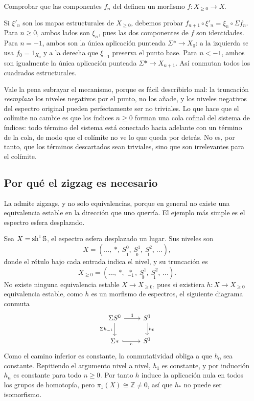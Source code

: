 \begin{ejer}
Comprobar que las componentes $f_n$ del  definen un morfismo $f\colon X_{\ge0}\to X$.
\end{ejer}
\begin{sol}
Si $\xi'_n$ son los mapas estructurales de $X_{\ge0}$, debemos probar $f_{n+1}\circ\xi'_n=\xi_n\circ\Sigma f_n$. Para $n\ge0$, ambos lados son $\xi_n$, pues las dos componentes de $f$ son identidades. Para $n=-1$, ambos son la única aplicación punteada $\Sigma *\to X_0$: a la izquierda se usa $f_0=1_{X_0}$ y a la derecha que $\xi_{-1}$ preserva el punto base. Para $n<-1$, ambos son igualmente la única aplicación punteada $\Sigma *\to X_{n+1}$. Así conmutan todos los cuadrados estructurales.
\end{sol}


Vale la pena subrayar el mecanismo, porque es fácil describirlo mal: la truncación \emph{reemplaza} los niveles negativos por el punto, no los añade, y los niveles negativos del espectro original pueden perfectamente ser no triviales. Lo que hace que el colímite no cambie es que los índices $n\ge0$ forman una cola cofinal del sistema de índices: todo término del sistema está conectado hacia adelante con un término de la cola, de modo que el colímite no ve lo que queda por detrás. No es, por tanto, que los términos descartados sean triviales, sino que son irrelevantes para el colímite.

\subsection{Por qué el zigzag es necesario}\label{subsec:zigzag-necesario}

La  admite zigzags, y no solo equivalencias, porque en general no existe una equivalencia estable en la dirección que uno querría. El ejemplo más simple es el espectro esfera desplazado.

Sea $X=\operatorname{sh}^1\mathbb S$, el espectro esfera desplazado un lugar. Sus niveles son
\[
X=(\ldots,\ \ast,\ \underset{-1}{S^0},\ \underset{0}{S^1},\ \underset{1}{S^2},\ \ldots),
\]
donde el rótulo bajo cada entrada indica el nivel, y su truncación es
\[
X_{\ge0}=(\ldots,\ \ast,\ \underset{-1}{\ast},\ \underset{0}{S^1},\ \underset{1}{S^2},\ \ldots).
\]
No existe ninguna equivalencia estable $X\to X_{\ge0}$, pues si existiera $h\colon X\to X_{\ge0}$ equivalencia estable, como $h$ es un morfismo de espectros, el siguiente diagrama conmuta
\[
\begin{tikzcd}
\Sigma S^0 \arrow[r,"1"] \arrow[d,"\Sigma h_{-1}"'] & S^1 \arrow[d,"h_0"]\\
\Sigma\ast \arrow[hook,r,"c"'] & S^1
\end{tikzcd}
\]
Como el camino inferior es constante, la conmutatividad obliga a que $h_0$ sea constante. Repitiendo el argumento nivel a nivel, $h_1$ es constante, y por inducción $h_n$ es constante para todo $n\ge0$. Por tanto $h$ induce la aplicación nula en todos los grupos de homotopía, pero $\pi_1(X) \cong \mathbb{Z} \neq0$, así que $h_*$ no puede ser isomorfismo. 

